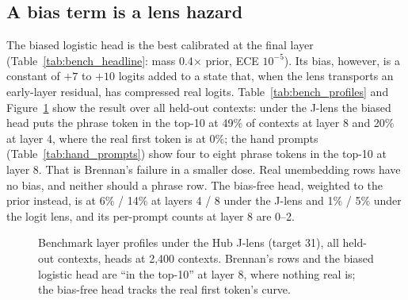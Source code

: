 \documentclass[11pt]{article}
\begin{document}


\subsection{A bias term is a lens hazard}
The biased logistic head is the best calibrated at the final layer (Table~\ref{tab:bench_headline}: mass 0.4$\times$ prior, ECE $10^{-5}$). Its bias, however, is a constant of $+7$ to $+10$ logits added to a state that, when the lens transports an early-layer residual, has compressed real logits. Table~\ref{tab:bench_profiles} and Figure~\ref{fig:profiles} show the result over all held-out contexts: under the J-lens the biased head puts the phrase token in the top-10 at 49\% of contexts at layer 8 and 20\% at layer 4, where the real first token is at 0\%; the hand prompts (Table~\ref{tab:hand_prompts}) show four to eight phrase tokens in the top-10 at layer 8. That is Brennan's failure in a smaller dose. Real unembedding rows have no bias, and neither should a phrase row. The bias-free head, weighted to the prior instead, is at 6\% / 14\% at layers 4 / 8 under the J-lens and 1\% / 5\% under the logit lens, and its per-prompt counts at layer 8 are 0--2.



\begin{figure}[t]
\centering
{}
\caption{Benchmark layer profiles under the Hub J-lens (target 31), all \BnHeld{} held-out contexts, heads at 2{,}400 contexts. Brennan's rows and the biased logistic head are ``in the top-10'' at layer 8, where nothing real is; the bias-free head tracks the real first token's curve.}
\label{fig:profiles}
\end{figure}
\end{document}
